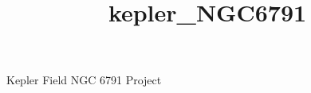 \documentclass[11pt,letterpaper]{book} %
\begin{document}
\univlogo

\title{kepler_NGC6791}

{\Huge Kepler Field NGC 6791 Project}







\end{document}
